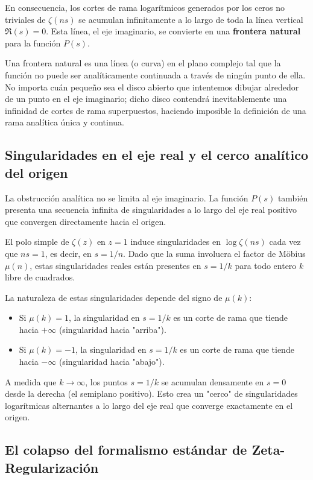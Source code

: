 En consecuencia, los cortes de rama logarítmicos generados por los ceros no triviales de $\zeta(ns)$ se acumulan infinitamente a lo largo de toda la línea vertical $\Re(s) = 0$. Esta línea, el eje imaginario, se convierte en una \textbf{frontera natural} para la función $P(s)$. 

Una frontera natural es una línea (o curva) en el plano complejo tal que la función no puede ser analíticamente continuada a través de ningún punto de ella. No importa cuán pequeño sea el disco abierto que intentemos dibujar alrededor de un punto en el eje imaginario; dicho disco contendrá inevitablemente una infinidad de cortes de rama superpuestos, haciendo imposible la definición de una rama analítica única y continua.

\subsection{Singularidades en el eje real y el cerco analítico del origen}

La obstrucción analítica no se limita al eje imaginario. La función $P(s)$ también presenta una secuencia infinita de singularidades a lo largo del eje real positivo que convergen directamente hacia el origen. 

El polo simple de $\zeta(z)$ en $z=1$ induce singularidades en $\log \zeta(ns)$ cada vez que $ns = 1$, es decir, en $s = 1/n$. Dado que la suma involucra el factor de Möbius $\mu(n)$, estas singularidades reales están presentes en $s = 1/k$ para todo entero $k$ libre de cuadrados. 

La naturaleza de estas singularidades depende del signo de $\mu(k)$:
\begin{itemize}
    \item Si $\mu(k) = 1$, la singularidad en $s = 1/k$ es un corte de rama que tiende hacia $+\infty$ (singularidad hacia "arriba").
    \item Si $\mu(k) = -1$, la singularidad en $s = 1/k$ es un corte de rama que tiende hacia $-\infty$ (singularidad hacia "abajo").
\end{itemize}

A medida que $k \to \infty$, los puntos $s = 1/k$ se acumulan densamente en $s = 0$ desde la derecha (el semiplano positivo). Esto crea un "cerco" de singularidades logarítmicas alternantes a lo largo del eje real que converge exactamente en el origen.

\subsection{El colapso del formalismo estándar de Zeta-Regularización}

